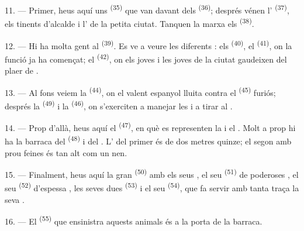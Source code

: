 11. --- Primer, heus aquí uns  \textsuperscript{(35)} que van
davant dels  \textsuperscript{(36)}; després vénen l'
\textsuperscript{(37)}, els tinents d'alcalde i l' de la petita
ciutat. Tanquen la marxa els  \textsuperscript{(38)}.

\VUsaut{5.0mm}
\VUsaut{3.6mm}

12. --- Hi ha molta gent al  \textsuperscript{(39)}. Es ve
a veure les diferents : els 
\textsuperscript{(40)}, el  \textsuperscript{(41)}, on la funció ja
ha començat; el  \textsuperscript{(42)}, on els joves i les
joves de la ciutat gaudeixen del plaer de .

13. --- Al fons veiem la  \textsuperscript{(44)}, on el
valent  espanyol lluita contra el 
\textsuperscript{(45)} furiós; després la 
\textsuperscript{(49)} i la  \textsuperscript{(46)}, on
s'exerciten a manejar les  i a tirar al .

14. --- Prop d'allà, heus aquí el  \textsuperscript{(47)},
en què es representen la  i el . Molt a prop hi ha
la barraca del  \textsuperscript{(48)} i del .
L' del primer és de dos metres quinze; el segon amb prou feines
és tan alt com un nen.

15. --- Finalment, heus aquí la gran 
\textsuperscript{(50)} amb els seus , el seu
 \textsuperscript{(51)} de poderoses , el seu
 \textsuperscript{(52)} d'espessa , les seves dues
 \textsuperscript{(53)} i el seu 
\textsuperscript{(54)}, que fa servir amb tanta traça la seva .

16. --- El  \textsuperscript{(55)} que ensinistra aquests animals
és a la porta de la barraca.
\VUsaut{6.0mm}
\VUfilet{22mm}
